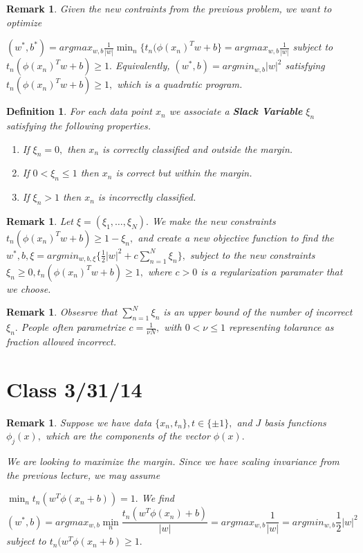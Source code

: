 \documentclass{amsart}
\newtheorem{defn}[subsubsection]{Definition}
\newtheorem{rem}[subsubsection]{Remark}
\begin{document}
\begin{rem}

Given the new contraints from the previous problem, we want to optimize 

$(w^*,b^*) = argmax_{w,b} \frac 1 {|w|} \min_n \{t_n(\phi(x_n)^T w +b \}= argmax_{w,b} \frac 1 {|w|}$ subject to 
$t_n (\phi(x_n)^Tw+b) \geq 1.$ Equivalently, $(w^*,b) = argmin_{w,b} |w|^2$ satisfying $t_n(\phi(x_n)^Tw+b)\geq 1,$ which is a quadratic program.

\end{rem}

\begin{defn}
For each data point $x_n$ we associate a {\bf Slack Variable} $\xi_n$ satisfying the following properties.
\begin{enumerate}
\item If $\xi_n =0,$ then $x_n$ is correctly classified and outside the margin.
\item If $0 <\xi_n \leq 1$ then $x_n$ is correct but within the margin.
\item If $\xi_n > 1$ then $x_n$ is incorrectly classified.
\end{enumerate}
\end{defn}

\begin{rem}
Let $\xi = (\xi_1,\ldots,\xi_N).$ We make the new constraints $t_n(\phi(x_n)^Tw+b) \geq 1 - \xi_n,$ and create a new objective function to find the $w^*,b,\xi = argmin_{w,b,\xi}\{ \frac 1 2 |w|^2 + c \sum_{n=1}^N\xi_n\},$ subject to the new constraints $\xi_n \geq 0, t_n(\phi(x_n)^Tw+b)\geq 1,$ where $c>0$ is a regularization paramater that we choose.
\end{rem}

\begin{rem}
Obsesrve that $\sum_{n=1}^N \xi_n$ is an upper bound of the number of incorrect $\xi_n.$ People often parametrize $c = \frac 1 {\nu N},$ with $0<\nu\leq 1$ representing tolarance as fraction allowed incorrect.
\end{rem}

\section{Class 3/31/14}

\begin{rem}
Suppose we have data $\{x_n,t_n\},t \in \{\pm 1\},$ and $J$ basis functions $\phi_j(x),$ which are the components of the vector $\phi(x).$

We are looking to maximize the margin. Since we have scaling invariance from the previous lecture, we may assume 

$\min_n t_n (w^T \phi(x_n +b))=1.$
We find
$$(w^*,b) = argmax_{w,b} \min_n \frac {t_n(w^T \phi(x_n)+b)}{|w|}= argmax_{w,b} \frac 1 {|w|}= argmin_{w,b} \frac 1 2 |w|^2$$ subject to $t_n (w^T \phi (x_n +b) \geq 1.$
\end{rem}
\end{document}
